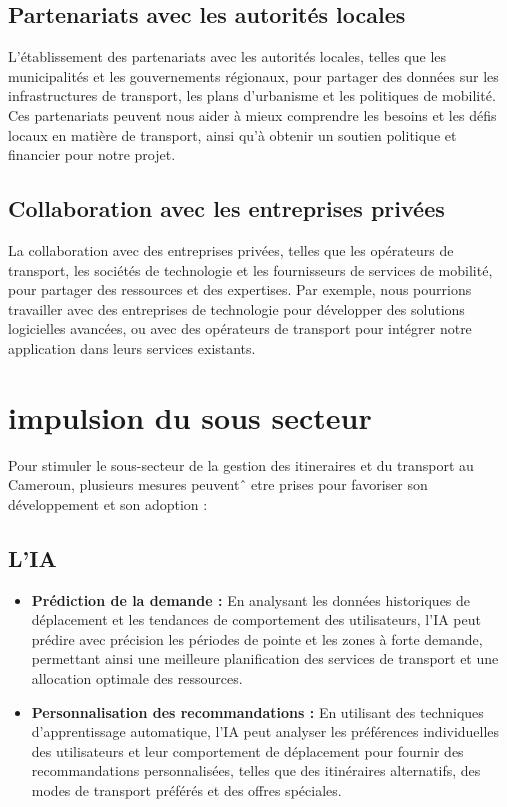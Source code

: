 \documentclass{article}
\begin{document}
\subsection{Partenariats avec les autorités locales}
L'établissement  des partenariats avec les autorités locales, telles que les municipalités et les gouvernements régionaux, pour partager des données sur les infrastructures de transport, les plans d'urbanisme et les politiques de mobilité. Ces partenariats peuvent nous aider à mieux comprendre les besoins et les défis locaux en matière de transport, ainsi qu'à obtenir un soutien politique et financier pour notre projet.

\subsection{Collaboration avec les entreprises privées}
La collaboration  avec des entreprises privées, telles que les opérateurs de transport, les sociétés de technologie et les fournisseurs de services de mobilité, pour partager des ressources et des expertises. Par exemple, nous pourrions travailler avec des entreprises de technologie pour développer des solutions logicielles avancées, ou avec des opérateurs de transport pour intégrer notre application dans leurs services existants.



\section{impulsion du sous secteur}


Pour stimuler le sous-secteur de la gestion des itineraires et du transport au
 Cameroun, plusieurs mesures peuventˆ etre prises pour favoriser son développement
 et son adoption :

 \subsection{L'IA}

\begin{itemize}
    \item \textbf{Prédiction de la demande :} En analysant les données historiques de déplacement et les tendances de comportement des utilisateurs, l'IA peut prédire avec précision les périodes de pointe et les zones à forte demande, permettant ainsi une meilleure planification des services de transport et une allocation optimale des ressources.
    
    \item \textbf{Personnalisation des recommandations :} En utilisant des techniques d'apprentissage automatique, l'IA peut analyser les préférences individuelles des utilisateurs et leur comportement de déplacement pour fournir des recommandations personnalisées, telles que des itinéraires alternatifs, des modes de transport préférés et des offres spéciales.
\end{itemize}
\end{document}
